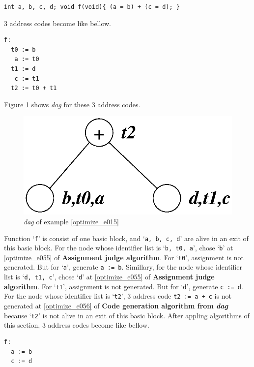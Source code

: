 \begin{Example}
\label{optimize_e015}
\begin{verbatim}
int a, b, c, d; void f(void){ (a = b) + (c = d); }
\end{verbatim}
3 address codes become like bellow.
\begin{verbatim}
f:
  t0 := b
   a := t0
  t1 := d
   c := t1
  t2 := t0 + t1
\end{verbatim}
Figure \ref{optimize_e016} shows {\em dag} for these 3 address codes.
\begin{figure}[htbp]
\begin{center}
\includegraphics[width=0.7\linewidth,height=0.362\linewidth]{opt005.eps}
\caption{{\em dag} of example \ref{optimize_e015}}
\label{optimize_e016}
\end{center}
\end{figure}
Function `{\tt{f}}' is consist of one basic block, and 
`{\tt{a, b, c, d}}' are alive in an exit of this basic block.
For the node whose identifier list is `{\tt{b, t0, a}}',
chose `{\tt{b}}' at \ref{optimize_e055} of {\bf Assignment judge
 algorithm}. For `{\tt{t0}}', assignment is not generated.
But for `{\tt{a}}', generate {\tt{a := b}}.
Simillary, for the node whose identifier list is `{\tt{d, t1, c}}',
chose `{\tt{d}}' at \ref{optimize_e055} of {\bf Assignment judge
 algorithm}. For `{\tt{t1}}', assignment is not generated.
But for `{\tt{d}}', generate {\tt{c := d}}.
For the node whose identifier list is `{\tt{t2}}',
3 address code {\tt{t2 := a + c}} is not generated
at \ref{optimize_e056} of {\bf Code generation algorithm from {\em dag}}
because `{\tt{t2}}' is not alive in an exit of this basic block.
After appling algorithms of this section,
3 address codes become like bellow.
\begin{verbatim}
f:
  a := b
  c := d
\end{verbatim}
\end{Example}

